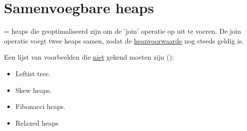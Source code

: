 \documentclass{report}
\begin{document}
\chapter{Samenvoegbare heaps}
= heaps die geoptimaliseerd zijn om de 'join' operatie op uit te voeren. De join operatie voegt twee heaps samen, zodat de \underline{heapvoorwaarde} nog steeds geldig is.

Een lijst van voorbeelden die \underline{niet} gekend moeten zijn ():
\begin{itemize}
	\item Leftist tree.
	\item Skew heaps.
	\item Fibonacci heaps.
	\item Relaxed heaps
\end{itemize}
\end{document}
